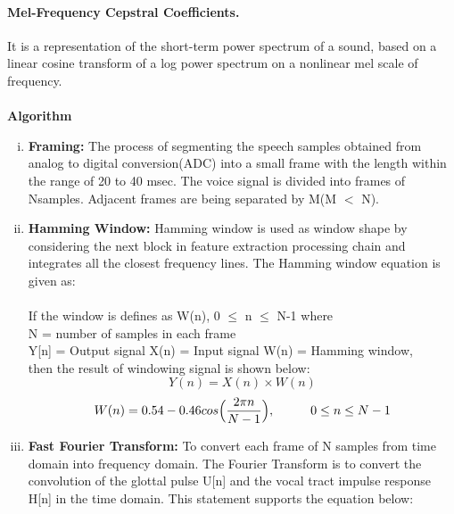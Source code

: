 \paragraph{Mel-Frequency Cepstral Coefficients.}
It is a representation of the short-term power spectrum of a sound, based on a linear cosine 
transform of a log power spectrum on a nonlinear mel scale of frequency.\\
\\
\textbf{Algorithm}
\begin{enumerate}[(i)]
        \item \textbf{Framing:}
                The process of segmenting the speech samples obtained from analog to digital conversion(ADC) into a small frame with the length within
                the range of 20 to 40 msec. The voice signal is divided into frames of Nsamples. Adjacent frames are being separated by M(M $<$ N).
        \item \textbf{Hamming Window:}
                Hamming window is used as window shape by considering the next block in feature extraction processing chain and integrates all the 
                closest frequency lines. The Hamming window equation is given as:\\
                \\
                If the window is defines as W(n), 0 $\le$ n $\le$ N-1 where\\
                N = number of samples in each frame\\
                Y[n] = Output signal
                X(n) = Input signal
                W(n) = Hamming window,\\
                then the result of windowing signal is shown below:
                \begin{equation}
                        Y(n) = X(n) \times W(n)
                \end{equation}
                \begin{equation}
                        W(n) = 0.54 - 0.46cos\Big(\frac{2 \pi n}{N-1}\Big), \hspace{10mm}0 \le n \le N-1
                \end{equation}
        \item \textbf{Fast Fourier Transform:}
                To convert each frame of N samples from time domain into frequency domain. The Fourier Transform is to convert the
                convolution of the glottal pulse U[n] and the vocal tract impulse response H[n] in the time domain. This statement supports the equation below:

\end{enumerate}
